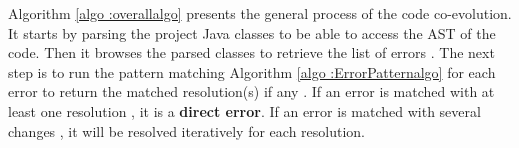 	
	
	Algorithm \ref{algo :overallalgo} presents the general process of the code co-evolution. It starts by parsing the project Java classes {\small{}} to be able to access the AST of the code. Then it browses the parsed classes to retrieve the list of errors {\small{}}. 
	The next step is to run the pattern matching Algorithm \ref{algo :ErrorPatternalgo} for each error to return the matched resolution(s) if any {\small{}}. 
	If an error is matched with at least one resolution {\small{}}, it is a \textbf{direct error}. If an error is matched with several changes {\small{}}, it will be resolved iteratively for each resolution{\small{}}. 
	
